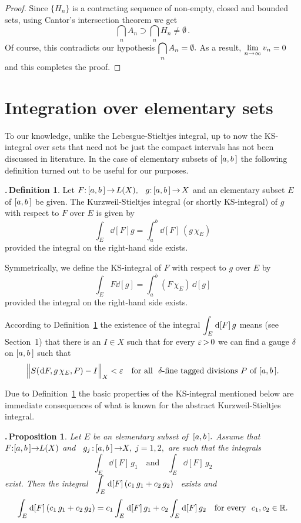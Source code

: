 \documentclass[12pt,twoside]{article}
\numberwithin{equation}{section}
\theoremstyle{plain}
\newtheorem{proposition}[theorem]{\hskip-1mm.\,Proposition}
\theoremstyle{definition}
\newtheorem{definition}[theorem]{\hskip-1mm.\,Definition}
\begin{document}
{\begin{proof}
Since $\{H_n\}$ is a contracting sequence of non-empty, closed and bounded sets,
using Cantor's intersection theorem we get
\[
   \bigcap_n A_n\supset\bigcap_n H_n\ne\emptyset\,.
\]
Of course, this contradicts our hypothesis $\displaystyle\bigcap_n A_n=\emptyset.$ As a result,
$\displaystyle\lim_{n\to\infty}v_n=0$ and this completes the proof.
\end{proof}

\section{Integration over elementary sets}
To our knowledge, unlike the Lebesgue-Stieltjes integral, up to now the KS-integral
over sets that need not be just the compact intervals has not been discussed
in literature. In the case of elementary subsets of $[a,b\,]$ the following definition
turned out to be useful for our purposes.

\skipaline

\begin{definition}\label{D5.1}
Let $F{:}\,[a,b\,]\,{\to}\,L(X),$ \ $g{:}\,[a,b\,]\,{\to}\,X$ and an elementary subset $E$
of $[a,b\,]$ be given. The Kurzweil-Stieltjes integral (or shortly KS-integral) of $g$
with respect to $F$ over $E$ is given by
\[
\int_E\dd[F]g=\int_a^b\dd[F]\,(g\,\chi_E)
\]
provided the integral on the right-hand side exists.

\smallskip

Symmetrically, we define the KS-integral of $F$ with respect to $g$ over $E$ by
\[
\int_EF\dd[g]=\int_a^b(F\,\chi_E)\,\dd[g]
\]
provided the integral on the right-hand side exists.
\end{definition}

\smallskip

According to Definition~\ref{D5.1} the existence of the integral $\displaystyle\int_E\hskip0.2mm\mbox{\rm d}[F]\,g$
means (see Section~1) that there is an $I\in X$ such that for every $\varepsilon\,{>}\,0$
we can find a gauge $\delta$ on $[a,b\,]$ such that
\[
   \Big\|S(\hskip0.2mm\mbox{\rm d} F,g\,\chi_E,P)-I\Big\|_X<\varepsilon
   \quad\mbox{for all \ $\delta$-fine tagged divisions $P$ of $[a,b\,]$}.
\]

\smallskip

Due to Definition~\ref{D5.1} the basic properties of the KS-integral mentioned below
are immediate consequences of what is known for the abstract Kurzweil-Stieltjes integral.

\smallskip

\begin{proposition}\label{linear}
Let $E$ be an elementary subset of $\,[a,b\,].$ Assume that $F{:}[a,b\,]{\to}L(X)$
and \ $g_{j}\,{:}\,[a,b\,]\,{\to}X,$ $j=1,2,$ are such that the integrals
\[
    \int_E\dd[F]\,g_1 \quad\mbox{and}\quad \int_E\dd[F]\,g_2
\]
exist. Then the integral \ $\displaystyle\int_E\hskip0.2mm\mbox{\rm d}[F]\,(c_1\,g_1+c_2\,g_2)$ \ exists and
\[
  \int_E\hskip0.2mm\mbox{\rm d}[F]\,(c_1\,g_1+c_2\,g_2)=c_1\int_E\hskip0.2mm\mbox{\rm d}[F]\,g_1+c_2\int_E\hskip0.2mm\mbox{\rm d}[F]\,g_2
  \quad\mbox{for every \ } c_1,c_2\in{\mathbb R}.
\]


\end{proposition}}
\end{document}
